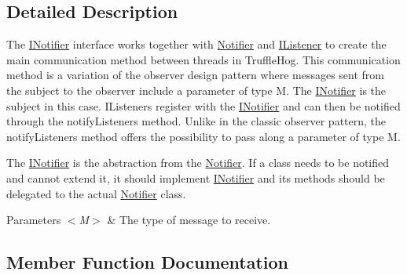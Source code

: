 \subsection{Detailed Description}
The \hyperlink{interfaceedu_1_1kit_1_1trufflehog_1_1util_1_1_i_notifier}{I\+Notifier} interface works together with \hyperlink{classedu_1_1kit_1_1trufflehog_1_1util_1_1_notifier}{Notifier} and \hyperlink{interfaceedu_1_1kit_1_1trufflehog_1_1util_1_1_i_listener}{I\+Listener} to create the main communication method between threads in Truffle\+Hog. This communication method is a variation of the observer design pattern where messages sent from the subject to the observer include a parameter of type M. The \hyperlink{interfaceedu_1_1kit_1_1trufflehog_1_1util_1_1_i_notifier}{I\+Notifier} is the subject in this case. I\+Listeners register with the \hyperlink{interfaceedu_1_1kit_1_1trufflehog_1_1util_1_1_i_notifier}{I\+Notifier} and can then be notified through the notify\+Listeners method. Unlike in the classic observer pattern, the notify\+Listeners method offers the possibility to pass along a parameter of type M. 

The \hyperlink{interfaceedu_1_1kit_1_1trufflehog_1_1util_1_1_i_notifier}{I\+Notifier} is the abstraction from the \hyperlink{classedu_1_1kit_1_1trufflehog_1_1util_1_1_notifier}{Notifier}. If a class needs to be notified and cannot extend it, it should implement \hyperlink{interfaceedu_1_1kit_1_1trufflehog_1_1util_1_1_i_notifier}{I\+Notifier} and its methods should be delegated to the actual \hyperlink{classedu_1_1kit_1_1trufflehog_1_1util_1_1_notifier}{Notifier} class. 


\begin{DoxyParams}{Parameters}
{\em $<$\+M$>$} & The type of message to receive. \\
\hline
\end{DoxyParams}


\subsection{Member Function Documentation}
\hypertarget{interfaceedu_1_1kit_1_1trufflehog_1_1util_1_1_i_notifier_a5f823c4f68c848816503f09646ca08ba}{}
